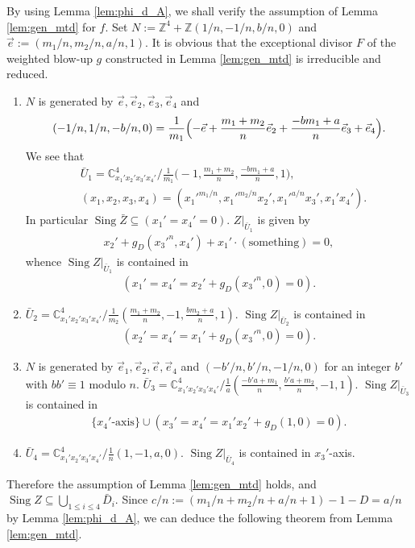\documentclass[a4paper,11pt]{amsart}
\theoremstyle{definition}
\theoremstyle{remark}
\numberwithin{equation}{section}
\newcommand{\bC}{{\mathbb C}}
\newcommand{\bZ}{{\mathbb Z}}
\newcommand{\axis}{\textrm{-}\mathrm{axis}}
\newcommand{\Sing}{\operatorname{Sing}}
\newcommand{\something}{\mathrm{something}}
\begin{document}
By using Lemma \ref{lem:phi_d_A},
we shall verify the assumption of Lemma \ref{lem:gen_mtd} for $f$.
Set $N:=\bZ^4+\bZ(1/n,-1/n,b/n,0)$ and $\vec{e}:=(m_1/n,m_2/n,a/n,1)$.
It is obvious that the exceptional divisor $F$ of the weighted blow-up $g$
constructed in Lemma \ref{lem:gen_mtd} is irreducible and reduced.
\begin{enumerate}
\item
$N$ is generated by $\vec{e},\vec{e}_2,\vec{e}_3,\vec{e}_4$ and
\begin{align*}
(-1/n,1/n,-b/n,0)=
\frac{1}{m_1}\Bigl(-\vec{e}+\frac{m_1+m_2}{n}\vec{e}_2
+\frac{-bm_1+a}{n}\vec{e}_3+\vec{e}_4\Bigr).
\end{align*}
We see that
\begin{align*}
&\bar{U}_1=\bC^4_{x_1'x_2'x_3'x_4'}/
\frac{1}{m_1}\big(-1,\frac{m_1+m_2}{n},\frac{-bm_1+a}{n},1\big),\\
&(x_1,x_2,x_3,x_4)=
({x_1'}^{m_1/n},{x_1'}^{m_2/n}x_2',{x_1'}^{a/n}x_3',x_1'x_4').
\end{align*}
In particular $\Sing\bar{Z} \subseteq (x_1'=x_4'=0)$.
$Z|_{\bar{U}_1}$ is given by
\begin{align*}
x_2'+g_D({x_3'}^n,x_4')+x_1'\cdot(\something)=0,
\end{align*}
whence $\Sing Z|_{\bar{U}_1}$ is contained in
\begin{align*}
(x_1'=x_4'=x_2'+g_D({x_3'}^n,0)=0).
\end{align*}
\item
$\bar{U}_2=\bC^4_{x_1'x_2'x_3'x_4'}/
\frac{1}{m_2}(\frac{m_1+m_2}{n},-1,\frac{bm_2+a}{n},1)$.
$\Sing Z|_{\bar{U}_2}$ is contained in
\begin{align*}
(x_2'=x_4'=x_1'+g_D({x_3'}^n,0)=0).
\end{align*}
\item
$N$ is generated by $\vec{e}_1,\vec{e}_2,\vec{e},\vec{e}_4$
and $(-b'/n,b'/n,-1/n,0)$ for an integer $b'$ with $bb'\equiv1$ modulo $n$.
$\bar{U}_3=\bC^4_{x_1'x_2'x_3'x_4'}/
\frac{1}{a}(\frac{-b'a+m_1}{n},\frac{b'a+m_2}{n},-1,1)$.
$\Sing Z|_{\bar{U}_3}$ is contained in
\begin{align*}
\{x_4'\axis\} \cup (x_3'=x_4'=x_1'x_2'+g_D(1,0)=0).
\end{align*}
\item
$\bar{U}_4=
\bC^4_{x_1'x_2'x_3'x_4'}/\frac{1}{n}(1,-1,a,0)$.
$\Sing Z|_{\bar{U}_4}$ is contained in $x_3'$-axis.
\end{enumerate}
Therefore the assumption of Lemma \ref{lem:gen_mtd} holds,
and $\Sing Z \subseteq \bigcup_{1 \le i \le 4} \bar{D}_i$.
Since $c/n:=(m_1/n+m_2/n+a/n+1)-1-D=a/n$ by Lemma \ref{lem:phi_d_A},
we can deduce the following theorem from Lemma \ref{lem:gen_mtd}.
\end{document}
